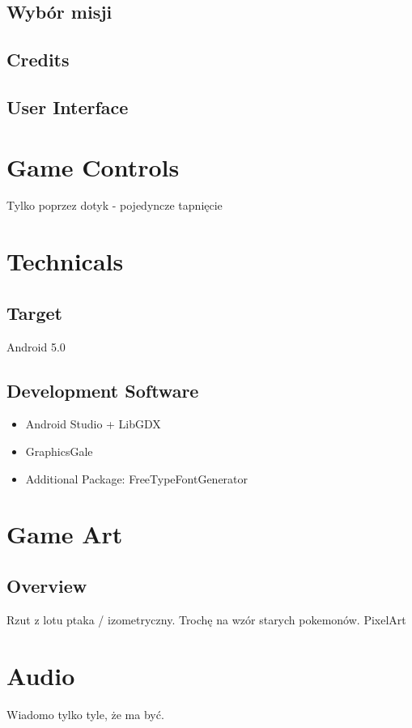 \documentclass[12pt]{article}
\begin{document}
\subsection{Wybór misji}
\subsection{Credits}
\subsection{User Interface}

\newpage
\section{Game Controls}
Tylko poprzez dotyk - pojedyncze tapnięcie 

\newpage
\section{Technicals}
\subsection{Target}
Android 5.0
\subsection{Development Software}
	\begin{itemize}
	\item Android Studio + LibGDX
	\item GraphicsGale
	\item Additional Package: FreeTypeFontGenerator
	\end{itemize}


\newpage
\section{Game Art}
\subsection{Overview}
Rzut z lotu ptaka / izometryczny. Trochę na wzór starych pokemonów. PixelArt

\section{Audio}
Wiadomo tylko tyle, że ma być.

\newpage
\end{document}
